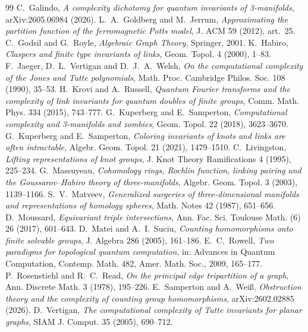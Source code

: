 \documentclass[11pt]{article}
\theoremstyle{definition}
\theoremstyle{remark}
\begin{document}
\begin{thebibliography}{99}
 C.~Galindo, \emph{A complexity dichotomy for quantum invariants of
3-manifolds}, arXiv:2605.06984 (2026).
 L.~A.~Goldberg and M.~Jerrum, \emph{Approximating the partition
function of the ferromagnetic Potts model}, J. ACM 59 (2012), art.~25.
 C.~Godsil and G.~Royle, \emph{Algebraic Graph Theory}, Springer,
2001.
 K.~Habiro, \emph{Claspers and finite type invariants of links},
Geom. Topol. 4 (2000), 1--83.
 F.~Jaeger, D.~L.~Vertigan and D.~J.~A.~Welsh, \emph{On the
computational complexity of the Jones and Tutte polynomials}, Math. Proc.
Cambridge Philos. Soc. 108 (1990), 35--53.
 H.~Krovi and A.~Russell, \emph{Quantum Fourier transforms and the
complexity of link invariants for quantum doubles of finite groups}, Comm. Math.
Phys. 334 (2015), 743--777.
 G.~Kuperberg and E.~Samperton, \emph{Computational complexity and
3-manifolds and zombies}, Geom. Topol. 22 (2018), 3623--3670.
 G.~Kuperberg and E.~Samperton, \emph{Coloring invariants of knots
and links are often intractable}, Algebr. Geom. Topol. 21 (2021), 1479--1510.
 C.~Livingston, \emph{Lifting representations of knot groups}, J.
Knot Theory Ramifications 4 (1995), 225--234.
 G.~Massuyeau, \emph{Cohomology rings, Rochlin function, linking
pairing and the Goussarov--Habiro theory of three-manifolds}, Algebr. Geom.
Topol. 3 (2003), 1139--1166.
 S.~V.~Matveev, \emph{Generalized surgeries of three-dimensional
manifolds and representations of homology spheres}, Math. Notes 42 (1987),
651--656.
 D.~Moussard, \emph{Equivariant triple intersections}, Ann. Fac.
Sci. Toulouse Math. (6) 26 (2017), 601--643.
 D.~Matei and A.~I.~Suciu, \emph{Counting homomorphisms onto finite
solvable groups}, J. Algebra 286 (2005), 161--186.
 E.~C.~Rowell, \emph{Two paradigms for topological quantum
computation}, in: Advances in Quantum Computation, Contemp. Math. 482, Amer.
Math. Soc., 2009, 165--177.
 P.~Rosenstiehl and R.~C.~Read, \emph{On the principal edge
tripartition of a graph}, Ann. Discrete Math. 3 (1978), 195--226.
 E.~Samperton and A.~Wei\ss, \emph{Obstruction theory and the
complexity of counting group homomorphisms}, arXiv:2602.02885 (2026).
 D.~Vertigan, \emph{The computational complexity of Tutte
invariants for planar graphs}, SIAM J. Comput. 35 (2005), 690--712.
\end{thebibliography}
\end{document}
